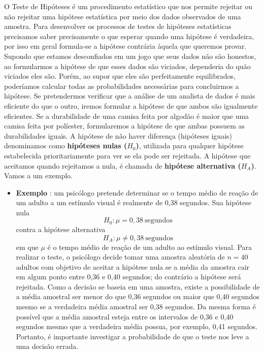 \documentclass[
  openany]{book}
\providecommand{\tightlist}{%
  \setlength{\itemsep}{0pt}\setlength{\parskip}{0pt}}
\begin{document}
O Teste de Hipóteses é um procedimento estatístico que nos permite rejeitar ou não rejeitar uma hipótese estatística por meio dos dados observados de uma amostra. Para desenvolver os processos de testes de hipóteses estatísticas precisamos saber precisamente o que esperar quando uma hipótese é verdadeira, por isso em geral formula-se a hipótese contrária àquela que queremos provar. Supondo que estamos desconfiados em um jogo que seus dados não são honestos, ao formularmos a hipótese de que esses dados são viciados, dependeria do quão viciados eles são. Porém, ao supor que eles são perfeitamente equilibrados, poderíamos calcular todas as probabilidades necessárias para concluirmos a hipótese. Se pretendermos verificar que a análise de um analista de dados é mais eficiente do que o outro, iremos formular a hipótese de que ambos são igualmente eficientes. Se a durabilidade de uma camisa feita por algodão é maior que uma camisa feita por políester, formularemos a hipótese de que ambas possuem as durabilidades iguais. A hipótese de não haver diferença (hipóteses iguais) denominamos como \textbf{hipóteses nulas (\(H_0\))}, utilizada para qualquer hipótese estabelecida prioritariamente para ver se ela pode ser rejeitada. A hipótese que aceitamos quando rejeitamos a nula, é chamada de \textbf{hipótese alternativa (\(H_A\))}. Vamos a um exemplo.

\begin{itemize}
\tightlist
\item
  \textbf{Exemplo} \citep{freund2009estatistica}: um psicólogo pretende determinar se o tempo médio de reação de um adulto a um estímulo visual é realmente de 0,38 segundos. Sua hipótese nula
  \[H_0: \mu=0,38\ \mbox{segundos}\]
  contra a hipótese alternativa
  \[H_A: \mu \neq 0,38\ \mbox{segundos}\]
  em que \(\mu\) é o tempo médio de reação de um adulto ao estímulo visual. Para realizar o teste, o psicólogo decide tomar uma amostra aleatória de \(n=40\) adultos com objetivo de aceitar a hipótese nula se a média da amostra cair em algum ponto entre 0,36 e 0,40 segundos; do contrário a hipótese será rejeitada. Como a decisão se baseia em uma amostra, existe a possibilidade de a média amostral ser menor do que 0,36 segundos ou maior que 0,40 segundos mesmo se a verdadeira média amostral ser 0,38 segundos. Da mesma forma é possível que a média amostral esteja entre os intervalos de 0,36 e 0,40 segundos mesmo que a verdadeira média possua, por exemplo, 0,41 segundos. Portanto, é importante investigar a probabilidade de que o teste nos leve a uma decisão errada.
\end{itemize}
\end{document}
